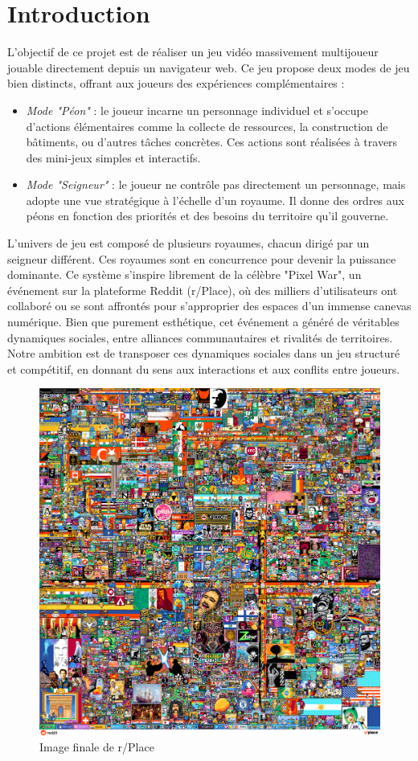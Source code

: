 \section{Introduction}

L'objectif de ce projet est de réaliser un jeu vidéo massivement multijoueur jouable directement depuis un navigateur web. Ce jeu propose deux modes de jeu bien distincts, offrant aux joueurs des expériences complémentaires :

\begin{itemize}
    \item \textit{Mode "Péon"} : le joueur incarne un personnage individuel et s’occupe d’actions élémentaires comme la collecte de ressources, la construction de bâtiments, ou d'autres tâches concrètes. Ces actions sont réalisées à travers des mini-jeux simples et interactifs.
    \item \textit{Mode "Seigneur"} : le joueur ne contrôle pas directement un personnage, mais adopte une vue stratégique à l’échelle d’un royaume. Il donne des ordres aux péons en fonction des priorités et des besoins du territoire qu’il gouverne.
\end{itemize}

L’univers de jeu est composé de plusieurs royaumes, chacun dirigé par un seigneur différent. Ces royaumes sont en concurrence pour devenir la puissance dominante. Ce système s'inspire librement de la célèbre "Pixel War", un événement sur la plateforme Reddit (r/Place), où des milliers d'utilisateurs ont collaboré ou se sont affrontés pour s’approprier des espaces d’un immense canevas numérique. Bien que purement esthétique, cet événement a généré de véritables dynamiques sociales, entre alliances communautaires et rivalités de territoires. Notre ambition est de transposer ces dynamiques sociales dans un jeu structuré et compétitif, en donnant du sens aux interactions et aux conflits entre joueurs.



\begin{figure}[!h]
   \centering
    \includegraphics[width=0.5\linewidth]{images/pixelwar.png}
    \caption{Image finale de r/Place}
    \label{fig:pixelwar}
\end{figure}

